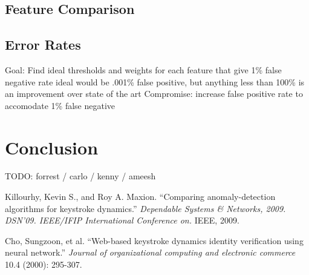 \documentclass{article}
\begin{document}
\subsection{Feature Comparison} %


\subsection{Error Rates}    %

Goal: Find ideal thresholds and weights for each feature that give 1\% false negative rate
ideal would be  .001\% false positive, but anything less than 100\% is an improvement over state of the art
Compromise: increase false positive rate to accomodate 1\% false negative

\section{Conclusion}
TODO: forrest / carlo / kenny / ameesh


\begin{thebibliography}{99}
   Killourhy, Kevin S., and Roy A. Maxion. 
   ``Comparing anomaly-detection algorithms for keystroke dynamics.''
   \textit{Dependable Systems \& Networks, 2009. DSN'09. IEEE/IFIP International Conference on.}
   IEEE, 2009. 
 
   Cho, Sungzoon, et al.
   ``Web-based keystroke dynamics identity verification using neural network.'' 
   \textit{Journal of organizational computing and electronic commerce}
   10.4 (2000): 295-307.
  
\end{thebibliography}
\end{document}
